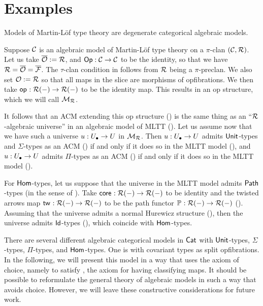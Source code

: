 \section{Examples}

Models of Martin-L\"of type theory are degenerate categorical algebraic models.
\begin{example}
  Suppose $\mathcal{C}$ is an algebraic model of Martin-L\"of type theory
  on a $\pi$-clan $(\mathcal{C},\mathcal{R})$.
  Let us take ${\overline{{\mathcal{O}}}} := \mathcal{R}$,
  and $\mathop{\mathsf{Op}} : \mathcal{C} \to \mathcal{C}$ to be the identity,
  so that we have $\mathcal{R} = {\overline{{\mathcal{O}}}} = {\overline{{\mathcal{F}}}}$.
  The $\tau$-clan condition in 
  follows from $\mathcal{R}$ being a $\pi$-preclan.
  We also set ${\mathcal{O}} := \mathcal{R}$ so that all maps in the slice are
  morphisms of opfibrations.
  We then take $\mathop{\mathsf{op}_{}} : \mathcal{R}(-) \to \mathcal{R}(-)$ to be the identity map.
  This results in an op structure, which we will call $\mathcal{M}_{\mathcal{R}}$.
  
  It follows that an ACM extending this op structure () is the same thing as
  an ``$\mathcal{R}$-algebraic universe'' in an algebraic model of MLTT ().
  Let us assume now that we have such a universe ${u} : {U_\bullet} \to U$ in $\mathcal{M}_{\mathcal{R}}$.
  Then ${u} : {U_\bullet} \to U$ admits $\mathsf{Unit}$-types and $\Sigma$-types as an ACM ()
  if and only if it does so in the MLTT model (),
  and ${u} : {U_\bullet} \to U$ admits $\Pi$-types as an ACM ()
  if and only if it does so in the MLTT model ().

  For $\mathsf{Hom}$-types,
  let us suppose that the universe in the MLTT model admits $\mathop{\mathsf{Path}}$-types
  (in the sense of ).
  Take $\mathop{\mathsf{core}_{}} : \mathcal{R}(-) \to \mathcal{R}(-)$ to be identity
  and the twisted arrows map $\mathop{\mathsf{tw}_{}} : \mathcal{R}(-) \to \mathcal{R}(-)$
  to be the path functor $\mathop{\mathbb{P}_{}} : \mathcal{R}(-) \to \mathcal{R}(-)$ ().
  Assuming that the universe admits a normal Hurewicz structure (),
  then the universe admits $\mathsf{Id}$-types (),
  which coincide with $\mathsf{Hom}$-types.
\end{example}

There are several different algebraic categorical models in $\mathsf{Cat}$ with 
$\mathsf{Unit}$-types, $\Sigma$-types, $\Pi$-types, and $\mathsf{Hom}$-types.
One is with covariant types as split opfibrations.
In the following,
we will present this model in a way that uses the axiom of choice,
namely to satisfy ,
the axiom for having classifying maps.
It should be possible to reformulate the general theory of algebraic models
in such a way that avoids choice.
However, we will leave these constructive considerations for future work.

